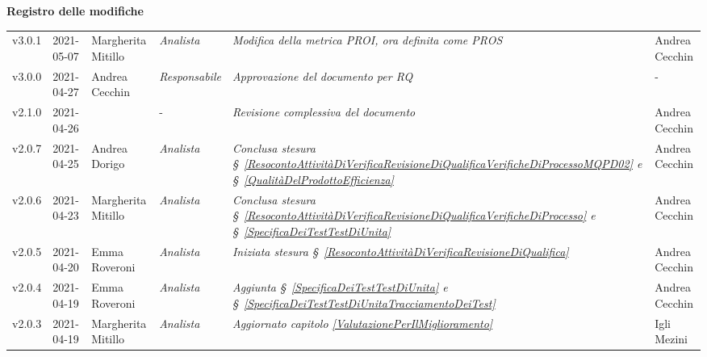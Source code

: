 \quad
\begin{center}
	\LARGE\textbf{Registro delle modifiche}
\end{center}

\def\tabularxcolumn#1{m{#1}}
{
\begin{center}
	\renewcommand{\arraystretch}{1.4}
	\begin{longtable}[c]{|p{2cm-1\tabcolsep}|p{2cm}|p{}|p{}|p{}|p{4cm-2\tabcolsep}|}
		\hline
		\rowcolor{airforceblue}
		\makecell[tc]{\textbf{Versione}} & \makecell[tc]{\textbf{Data}} & \makecell[tc]{\textbf{Autore}} & \makecell[tc]{\textbf{Ruolo}} & \makecell[tc]{\textbf{Modifica}} & \makecell[tc]{\textbf{Verificatore}}\\
		\hline
		\centering v3.0.1 & 2021-05-07 & Margherita Mitillo & \centering\textit{Analista}  &  \textit{Modifica della metrica PROI, ora definita come PROS} & Andrea Cecchin \\
		\hline
		\centering v3.0.0 & 2021-04-27 & Andrea Cecchin & \centering\textit{Responsabile}  &  \textit{Approvazione del documento per RQ} & - \\
		\hline
		\centering v2.1.0 & 2021-04-26 &  & \centering -  &  \textit{Revisione complessiva del documento} & Andrea Cecchin \\
		\hline
		\centering v2.0.7 & 2021-04-25 & Andrea Dorigo & \centering \textit{Analista}  &  \textit{Conclusa stesura  \S~\ref{ResocontoAttivitàDiVerificaRevisioneDiQualificaVerificheDiProcessoMQPD02} e \S~\ref{QualitàDelProdottoEfficienza}} & Andrea Cecchin \\
		\hline
		\centering v2.0.6 & 2021-04-23 & Margherita Mitillo & \centering \textit{Analista}  &  \textit{Conclusa stesura  \S~\ref{ResocontoAttivitàDiVerificaRevisioneDiQualificaVerificheDiProcesso} e \S~\ref{SpecificaDeiTestTestDiUnita}} & Andrea Cecchin \\
		\hline
		\centering v2.0.5 & 2021-04-20 & Emma Roveroni & \centering \textit{Analista}  &  \textit{Iniziata stesura  \S~\ref{ResocontoAttivitàDiVerificaRevisioneDiQualifica}} & Andrea Cecchin \\
		\hline
		\centering v2.0.4 & 2021-04-19 & Emma Roveroni & \centering \textit{Analista}  &  \textit{Aggiunta \S~\ref{SpecificaDeiTestTestDiUnita} e \S~\ref{SpecificaDeiTestTestDiUnitaTracciamentoDeiTest}} & Andrea Cecchin \\
		\hline
		\centering v2.0.3 & 2021-04-19 & Margherita Mitillo  & \centering \textit{Analista}   &  \textit{Aggiornato capitolo \ref{ValutazionePerIlMiglioramento}} & Igli Mezini \\

\end{longtable}
\end{center}}

